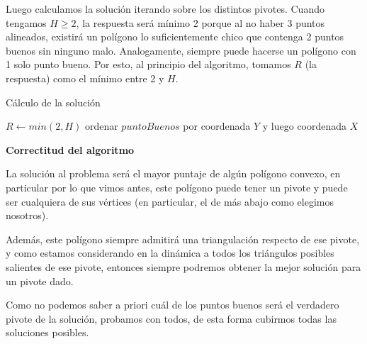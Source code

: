 Luego calculamos la solución iterando sobre los distintos pivotes. 
Cuando tengamos $H \geq 2$, la respuesta será mínimo 2 porque al no haber 
3 puntos alineados, existirá un polígono lo suficientemente chico que contenga 
2 puntos buenos sin ninguno malo. Analogamente, siempre puede hacerse un polígono 
con 1 solo punto bueno. Por esto, al principio del algoritmo, tomamos $R$ (la respuesta) 
como el mínimo entre 2 y $H$. 

\begin{algorithm}[H]
\caption{Cálculo de la solución}
$R \leftarrow min(2,H)$\;
ordenar $puntoBuenos$ por coordenada $Y$ y luego coordenada $X$\;
\end{algorithm}

\textbf{Correctitud del algoritmo}

La solución al problema será el mayor puntaje de algún polígono convexo, 
en particular por lo que vimos antes, este polígono puede tener un pivote y puede 
ser cualquiera de sus vértices (en particular, el de más abajo como elegimos nosotros). 

Además, este polígono siempre admitirá una triangulación respecto de ese pivote, y como 
estamos considerando en la dinámica a todos los triángulos posibles salientes de ese pivote, entonces 
siempre podremos obtener la mejor solución para un pivote dado. 

Como no podemos saber a priori cuál de los puntos buenos será el verdadero pivote de la solución, 
probamos con todos, de esta forma cubirmos todas las soluciones posibles. 

